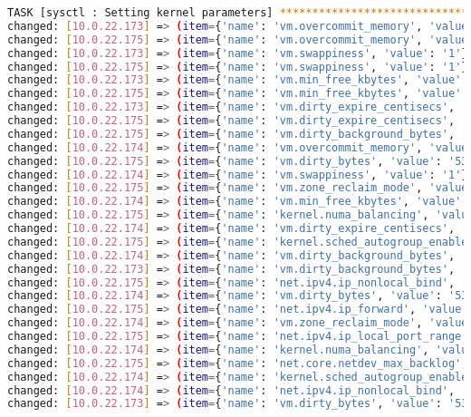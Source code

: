 \begin{flushleft}
\begin{lstlisting}[language=bash, caption=Deploy - Anhang - Deployt,captionpos=b,label={lst:deploy-appendix-deployt},breaklines=true]
TASK [sysctl : Setting kernel parameters] *************************************************************************************************************************************************************************
changed: [10.0.22.173] => (item={'name': 'vm.overcommit_memory', 'value': '2'})
changed: [10.0.22.175] => (item={'name': 'vm.overcommit_memory', 'value': '2'})
changed: [10.0.22.173] => (item={'name': 'vm.swappiness', 'value': '1'})
changed: [10.0.22.175] => (item={'name': 'vm.swappiness', 'value': '1'})
changed: [10.0.22.173] => (item={'name': 'vm.min_free_kbytes', 'value': '102400'})
changed: [10.0.22.175] => (item={'name': 'vm.min_free_kbytes', 'value': '102400'})
changed: [10.0.22.173] => (item={'name': 'vm.dirty_expire_centisecs', 'value': '1000'})
changed: [10.0.22.175] => (item={'name': 'vm.dirty_expire_centisecs', 'value': '1000'})
changed: [10.0.22.175] => (item={'name': 'vm.dirty_background_bytes', 'value': '67108864'})
changed: [10.0.22.174] => (item={'name': 'vm.overcommit_memory', 'value': '2'})
changed: [10.0.22.175] => (item={'name': 'vm.dirty_bytes', 'value': '536870912'})
changed: [10.0.22.174] => (item={'name': 'vm.swappiness', 'value': '1'})
changed: [10.0.22.175] => (item={'name': 'vm.zone_reclaim_mode', 'value': '0'})
changed: [10.0.22.174] => (item={'name': 'vm.min_free_kbytes', 'value': '102400'})
changed: [10.0.22.175] => (item={'name': 'kernel.numa_balancing', 'value': '0'})
changed: [10.0.22.174] => (item={'name': 'vm.dirty_expire_centisecs', 'value': '1000'})
changed: [10.0.22.175] => (item={'name': 'kernel.sched_autogroup_enabled', 'value': '0'})
changed: [10.0.22.174] => (item={'name': 'vm.dirty_background_bytes', 'value': '67108864'})
changed: [10.0.22.173] => (item={'name': 'vm.dirty_background_bytes', 'value': '67108864'})
changed: [10.0.22.175] => (item={'name': 'net.ipv4.ip_nonlocal_bind', 'value': '1'})
changed: [10.0.22.174] => (item={'name': 'vm.dirty_bytes', 'value': '536870912'})
changed: [10.0.22.175] => (item={'name': 'net.ipv4.ip_forward', 'value': '1'})
changed: [10.0.22.174] => (item={'name': 'vm.zone_reclaim_mode', 'value': '0'})
changed: [10.0.22.175] => (item={'name': 'net.ipv4.ip_local_port_range', 'value': '10000 65535'})
changed: [10.0.22.174] => (item={'name': 'kernel.numa_balancing', 'value': '0'})
changed: [10.0.22.175] => (item={'name': 'net.core.netdev_max_backlog', 'value': '10000'})
changed: [10.0.22.174] => (item={'name': 'kernel.sched_autogroup_enabled', 'value': '0'})
changed: [10.0.22.174] => (item={'name': 'net.ipv4.ip_nonlocal_bind', 'value': '1'})
changed: [10.0.22.173] => (item={'name': 'vm.dirty_bytes', 'value': '536870912'})

\end{lstlisting}
\end{flushleft}
